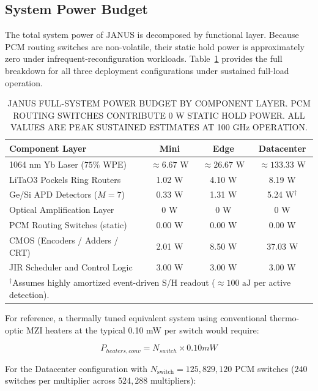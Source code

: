 \documentclass[journal]{IEEEtran}
\begin{document}
\subsection{\textbf{System Power Budget}}

The total system power of JANUS is decomposed by functional layer. Because PCM routing switches are non-volatile, their static hold power is approximately zero under infrequent-reconfiguration workloads. Table~\ref{tab:table15} provides the full breakdown for all three deployment configurations under sustained full-load operation.

\begin{table}[htbp]
\centering
\small
\setlength{\tabcolsep}{1pt}
\caption{JANUS FULL-SYSTEM POWER BUDGET BY COMPONENT LAYER. PCM ROUTING SWITCHES CONTRIBUTE 0 W STATIC HOLD POWER. ALL VALUES ARE PEAK SUSTAINED ESTIMATES AT 100 GHz OPERATION.}
\label{tab:table15}
\begin{tabular}{lccc}
\toprule
Component Layer & Mini & Edge & Datacenter \\
\midrule
1064 nm Yb Laser ($75\%$ WPE) & $\approx 6.67\text{ W}$ & $\approx 26.67\text{ W}$ & $\approx 133.33\text{ W}$ \\
LiTaO3 Pockels Ring Routers & 1.02 W & 4.10 W & 8.19 W \\
Ge/Si APD Detectors ($M = 7$) & 0.33 W & 1.31 W & 5.24 W$^\dagger$ \\
Optical Amplification Layer & 0 W & 0 W & 0 W \\
PCM Routing Switches (static) & 0.00 W & 0.00 W & 0.00 W \\
CMOS (Encoders / Adders / CRT) & 2.01 W & 8.50 W & 37.03 W \\
JIR Scheduler and Control Logic & 3.00 W & 3.00 W & 3.00 W \\
\bottomrule
\multicolumn{4}{l}{\scriptsize $^\dagger$Assumes highly amortized event-driven S/H readout ($\approx 100\text{ aJ}$ per active detection).} \\
\end{tabular}
\end{table}

For reference, a thermally tuned equivalent system using conventional thermo-optic MZI heaters at the typical 0.10 mW per switch would require:

\begin{equation}
P_{heaters,conv} = N_{switch} \times 0.10 mW
\end{equation}

For the Datacenter configuration with $N_{\mathrm{switch}} = 125,829,120$ PCM switches ($240$ switches per multiplier across $524,288$ multipliers):
\end{document}
